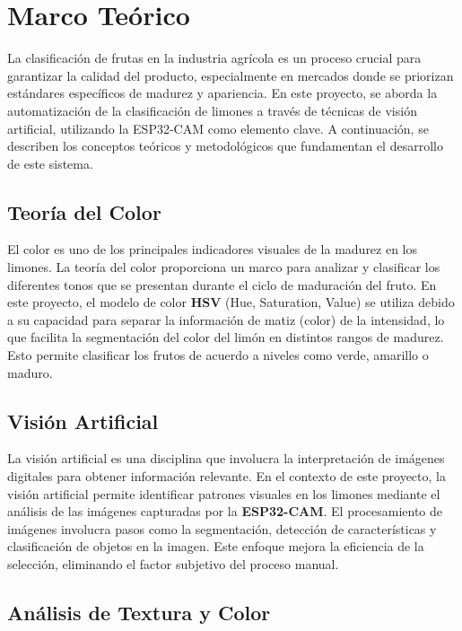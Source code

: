 \section{Marco Teórico}

La clasificación de frutas en la industria agrícola es un proceso crucial para garantizar la calidad del producto, especialmente en mercados donde se priorizan estándares específicos de madurez y apariencia. En este proyecto, se aborda la automatización de la clasificación de limones a través de técnicas de visión artificial, utilizando la ESP32-CAM como elemento clave. A continuación, se describen los conceptos teóricos y metodológicos que fundamentan el desarrollo de este sistema.

\subsection{Teoría del Color}

El color es uno de los principales indicadores visuales de la madurez en los limones. La teoría del color proporciona un marco para analizar y clasificar los diferentes tonos que se presentan durante el ciclo de maduración del fruto. En este proyecto, el modelo de color \textbf{HSV} (Hue, Saturation, Value) se utiliza debido a su capacidad para separar la información de matiz (color) de la intensidad, lo que facilita la segmentación del color del limón en distintos rangos de madurez. Esto permite clasificar los frutos de acuerdo a niveles como verde, amarillo o maduro.

\subsection{Visión Artificial}

La visión artificial es una disciplina que involucra la interpretación de imágenes digitales para obtener información relevante. En el contexto de este proyecto, la visión artificial permite identificar patrones visuales en los limones mediante el análisis de las imágenes capturadas por la \textbf{ESP32-CAM}. El procesamiento de imágenes involucra pasos como la segmentación, detección de características y clasificación de objetos en la imagen. Este enfoque mejora la eficiencia de la selección, eliminando el factor subjetivo del proceso manual.

\subsection{Análisis de Textura y Color}

